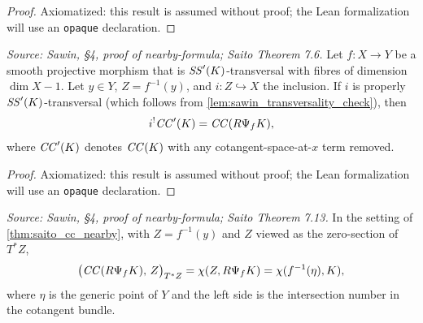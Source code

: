 \begin{proof}
  Axiomatized: this result is assumed without proof; the Lean formalization will use
  an \texttt{opaque} declaration.
\end{proof}

\begin{theorem}
  \label{thm:saito_cc_nearby}
  \textit{Source: Sawin, §4, proof of nearby-formula; Saito Theorem 7.6.}
  Let $f:X\to Y$ be a smooth projective morphism that is $\mathit{SS}'(K)$-transversal
  with fibres of dimension $\dim X-1$.  Let $y\in Y$, $Z=f^{-1}(y)$, and
  $i:Z\hookrightarrow X$ the inclusion.  If $i$ is properly $\mathit{SS}'(K)$-transversal
  (which follows from \cref{lem:sawin_transversality_check}), then
  \[ i^!\mathit{CC}'(K) = \mathit{CC}(R\Psi_f K), \]
  where $\mathit{CC}'(K)$ denotes $\mathit{CC}(K)$ with any cotangent-space-at-$x$ term removed.
\end{theorem}

\begin{proof}
  Axiomatized: this result is assumed without proof; the Lean formalization will use
  an \texttt{opaque} declaration.
\end{proof}

\begin{theorem}
  \label{thm:saito_index}
  \textit{Source: Sawin, §4, proof of nearby-formula; Saito Theorem 7.13.}
  In the setting of \cref{thm:saito_cc_nearby}, with $Z=f^{-1}(y)$ and $Z$ viewed
  as the zero-section of $T^*Z$,
  \[ \bigl(\mathit{CC}(R\Psi_f K),\, Z\bigr)_{T^*Z} = \chi(Z, R\Psi_f K) = \chi(f^{-1}(\eta), K), \]
  where $\eta$ is the generic point of $Y$ and the left side is the intersection
  number in the cotangent bundle.
\end{theorem}

